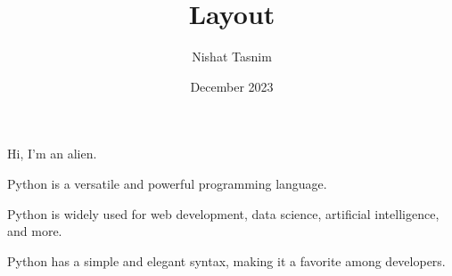 \documentclass{article}
\title{Layout}
\author{Nishat Tasnim}
\date{December 2023}
\begin{document}
\maketitle

Hi, I'm an alien.

\begin{flushleft}
    Python is a versatile and powerful programming language.
\end{flushleft}

\begin{flushright}
    Python is widely used for web development, data science, artificial intelligence, and more.
\end{flushright}

\begin{center}
    Python has a simple and elegant syntax, making it a favorite among developers.
\end{center}
\end{document}
